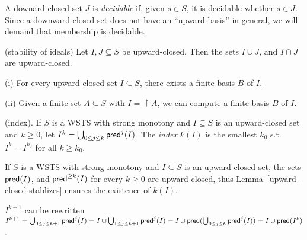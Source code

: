 \fi

A downard-closed set $J$ is {\em decidable} if, given $s \in S$, it is decidable whether
$s \in J$. 
Since a downward-closed set does not have an ``upward-basis'' in general, we will demand that membership is decidable.

\begin{claim}{(stability of ideals)}
Let $I, J \subseteq S$ be upward-closed. Then the sets $I \cup J$, and $I \cap J$ are upward-closed.
\end{claim}



\begin{fact}\label{fact basis}


(i) For every upward-closed set $I \subseteq S$, there exists a finite basis $B$ of $I$. 

(ii) Given a finite set $A \subseteq S$ with $I =\uparrow A$, we can compute a finite basis $B$ of $I$.

\end{fact}


\begin{definition}{ (index)}. 
If $S$ is a WSTS with strong monotony and $I \subseteq S$  is an upward-closed set and $k \geq 0$, let $I^k= \bigcup_{0 \leq j \leq k} \textsf{pred}^j(I)$.
The {\em index} $k(I)$ is the
smallest $k_0$ s.t. $I^k = I^{k_0}$ for all $k \geq k_0$.
\end{definition}


If $S$ is a WSTS with strong monotony and $I \subseteq S$ is an upward-closed set, the sets $\textsf{pred}(I )$, and $\textsf{pred}^{\geq k}(I )$ for
every $k \geq 0$ are upward-closed, thus Lemma~\ref{upward-closed stablizes} ensures the existence of $k(I)$.

\begin{remark}
$I^{k+1} $ can be rewritten $I^{k+1}= \bigcup_{0 \leq j \leq k+1} \textsf{pred}^j(I) = 
I \cup \bigcup_{1 \leq j \leq k+1} \textsf{pred}^j(I) =
I \cup \textsf{pred}(\bigcup_{0 \leq j \leq k} \textsf{pred}^j(I))
=  I \cup \textsf{pred}(I^k)$.
\end{remark}

